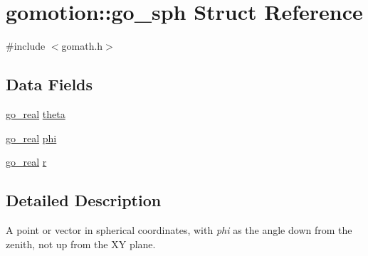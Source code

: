 \hypertarget{structgomotion_1_1go__sph}{\section{gomotion\-:\-:go\-\_\-sph Struct Reference}
\label{structgomotion_1_1go__sph}
}


{\ttfamily \#include $<$gomath.\-h$>$}

\subsection*{Data Fields}
\begin{DoxyCompactItemize}
\item 
\hyperlink{gotypes_8h_afd666a2393eebd71ee455846ac9def9b}{go\-\_\-real} \hyperlink{structgomotion_1_1go__sph_ad922b1e1556ad041c62ae71e2335e688}{theta}
\item 
\hyperlink{gotypes_8h_afd666a2393eebd71ee455846ac9def9b}{go\-\_\-real} \hyperlink{structgomotion_1_1go__sph_afd0964fc26067714ed465d2ea36ea90d}{phi}
\item 
\hyperlink{gotypes_8h_afd666a2393eebd71ee455846ac9def9b}{go\-\_\-real} \hyperlink{structgomotion_1_1go__sph_a44361cc285fdc563622c7f74121bc5d8}{r}
\end{DoxyCompactItemize}


\subsection{Detailed Description}
A point or vector in spherical coordinates, with {\itshape phi} as the angle down from the zenith, not up from the X\-Y plane. 

